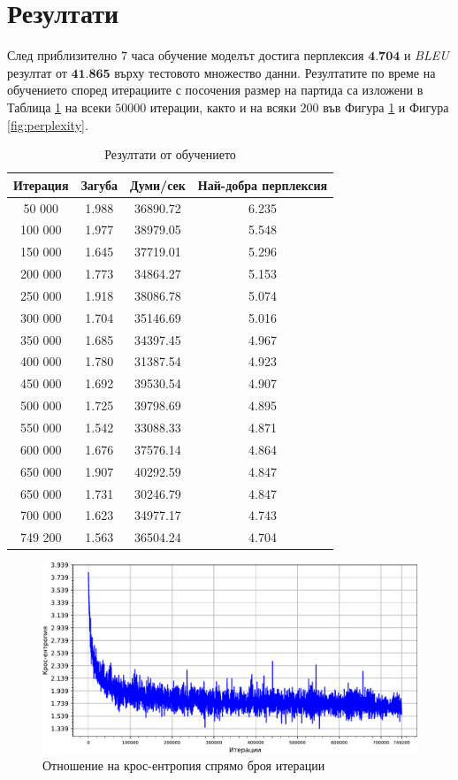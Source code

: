 \documentclass[12pt,oneside,a4paper]{article}
\begin{document}
	
	\section{Резултати}
	
	След приблизително $7$ часа обучение моделът достига перплексия $\textbf{4.704}$ и \textit{BLEU} резултат от $\textbf{41.865}$ върху тестовото множество данни. Резултатите по време на обучението според итерациите с посочения размер на партида са изложени в Таблица \ref{table:training_results} на всеки $50000$ итерации, както и на всяки $200$ във Фигура \ref{fig:loss} и Фигура \ref{fig:perplexity}.
	
	\begin{table}[h]
		\centering
		\begin{tabular}{|c|c|c|c|}
			\hline
			\textbf{Итерация}  & \textbf{Загуба} & \textbf{Думи/сек} & \textbf{Най-добра перплексия} \\
			\hline
			50 000 & 1.988 &36890.72 & 6.235\\
			100 000 &1.977 &38979.05 &5.548\\
			150 000 &1.645 &37719.01 &5.296\\
			200 000 &1.773 &34864.27 &5.153\\
			250 000 &1.918 &38086.78 &5.074\\
			300 000 &1.704 &35146.69 &5.016\\
			350 000 &1.685 &34397.45 &4.967\\
			400 000 &1.780 &31387.54 &4.923\\
			450 000 &1.692 &39530.54 &4.907\\
			500 000 &1.725 &39798.69 &4.895\\
			550 000 &1.542 &33088.33 &4.871\\
			600 000 &1.676 &37576.14 &4.864\\
			650 000 &1.907 &40292.59 &4.847\\
			650 000 &1.731 &30246.79 &4.847\\
			700 000 &1.623 &34977.17 &4.743\\
			749 200 &1.563 &36504.24 & 4.704\\
			\hline
		\end{tabular}
		\caption{Резултати от обучението}
		\label{table:training_results}
	\end{table}\newpage
	\begin{figure}[ht]
		\centering
		\includegraphics[width=0.9\linewidth]{loss.pdf}
		\caption{Отношение на крос-ентропия спрямо броя итерации}
		\label{fig:loss}
	\end{figure}
\end{document}
